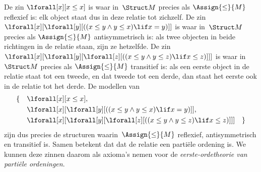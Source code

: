 \documentclass[../../../include/open-logic-section]{subfiles}
\begin{document}
\begin{ex}
De zin $\lforall[x][x \le x]$ is waar in~$\Struct M$ precies als
$\Assign{\le}{M}$ reflexief is: elk object staat dus in deze relatie
tot zichzelf. De zin
$\lforall[x][\lforall[y][((x \le y \land y \le x) \lif x = y)]]$ is
waar in~$\Struct M$ precies als $\Assign{\le}{M}$ antisymmetrisch is:
als twee objecten in beide richtingen in de relatie staan, zijn ze
hetzelfde. De zin
$\lforall[x][\lforall[y][\lforall[z][((x \le y \land y \le z)
      \lif x \le z)]]]$ is waar in~$\Struct M$ precies als
$\Assign{\le}{M}$ transitief is: als een eerste object in de relatie
staat tot een tweede, en dat tweede tot een derde, dan staat het eerste
ook in de relatie tot het derde. De modellen van
\begin{align*}
\{\quad &\lforall[x][x \le x], \\
   & \lforall[x][\lforall[y][((x \le y \land y \le
    x) \lif x = y)]], \\
   &\lforall[x][\lforall[y][\lforall[z][((x \le y
      \land y \le z) \lif x \le z)]]] \quad \}
\end{align*}
zijn dus precies de structuren waarin~$\Assign{\le}{M}$ reflexief,
antisymmetrisch en transitief is. Samen betekent dat dat de relatie een
partiële ordening is. We kunnen deze zinnen daarom als axioma's nemen
voor de \emph{eerste-ordetheorie van partiële ordeningen}.
\end{ex}
\end{document}
